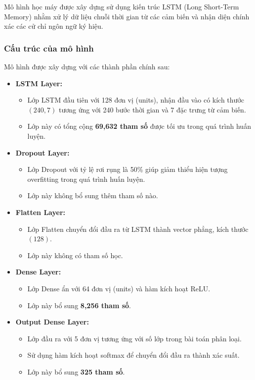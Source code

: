 Mô hình học máy được xây dựng sử dụng kiến trúc LSTM (Long Short-Term Memory) nhằm xử lý dữ liệu chuỗi thời gian từ các cảm biến và nhận diện chính xác các cử chỉ ngôn ngữ ký hiệu.

\subsubsection{Cấu trúc của mô hình}

Mô hình được xây dựng với các thành phần chính sau:
\begin{itemize}
    \item \textbf{LSTM Layer:}
    \begin{itemize}
        \item Lớp LSTM đầu tiên với 128 đơn vị (units), nhận đầu vào có kích thước $(240, 7)$ tương ứng với 240 bước thời gian và 7 đặc trưng từ cảm biến.
        \item Lớp này có tổng cộng \textbf{69,632 tham số} được tối ưu trong quá trình huấn luyện.
    \end{itemize}

    \item \textbf{Dropout Layer:}
    \begin{itemize}
        \item Lớp Dropout với tỷ lệ rơi rụng là 50\% giúp giảm thiểu hiện tượng overfitting trong quá trình huấn luyện.
        \item Lớp này không bổ sung thêm tham số nào.
    \end{itemize}

    \item \textbf{Flatten Layer:}
    \begin{itemize}
        \item Lớp Flatten chuyển đổi đầu ra từ LSTM thành vector phẳng, kích thước $(128)$.
        \item Lớp này không có tham số học.
    \end{itemize}

    \item \textbf{Dense Layer:}
    \begin{itemize}
        \item Lớp Dense ẩn với 64 đơn vị (units) và hàm kích hoạt ReLU.
        \item Lớp này bổ sung \textbf{8,256 tham số}.
    \end{itemize}

    \item \textbf{Output Dense Layer:}
    \begin{itemize}
        \item Lớp đầu ra với 5 đơn vị tương ứng với số lớp trong bài toán phân loại.
        \item Sử dụng hàm kích hoạt softmax để chuyển đổi đầu ra thành xác suất.
        \item Lớp này bổ sung \textbf{325 tham số}.
    \end{itemize}
\end{itemize}

